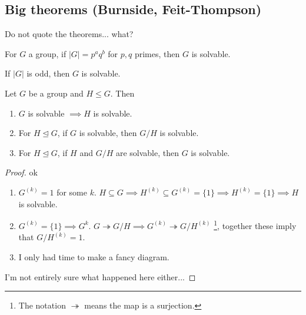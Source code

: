 \subsection{Big theorems (Burnside, Feit-Thompson)}
Do not quote the theorems... what? 
\begin{theorem}
   For $G$ a group, if $|G|=p^aq^b$ for $p,q$ primes, then $G$ is solvable. 
\end{theorem}
\begin{theorem}
    If $|G|$ is odd, then $G$ is solvable.
\end{theorem}
\begin{prop}
    Let $G$ be a group and $H\leq G$. Then 
    \begin{enumerate}
        \item $G$ is solvable $\implies H$ is solvable.
        \item For $H\trianglelefteq G$, if $G$ is solvable, then $G /H$ is solvable.
        \item For $H\trianglelefteq G$, if $H$ and $G /H$ are solvable, then $G$ is solvable.
    \end{enumerate}
\end{prop}
\begin{proof}
    ok
\begin{enumerate}
    \item $G^{(k)}=1$ for some $k$. $H\subseteq G \implies H^{(k)}\subseteq G^{(k)}=\{1\} \implies H^{(k)}=\{1\} \implies H$ is solvable.
    \item $G^{(k)}=\{1\} \implies G^{k}$. $G \twoheadrightarrow G /H \implies G^{(k)}\twoheadrightarrow G/H^{(k)}$ \footnote{The notation $\twoheadrightarrow$ means the map is a surjection.}, together these imply that $G /H ^{(k)}=1$.
    \item I only had time to make a fancy diagram.
                    \begin{figure}[H]
                \centering
            \end{figure}
\end{enumerate}    
I'm not entirely sure what happened here either...
\end{proof}
